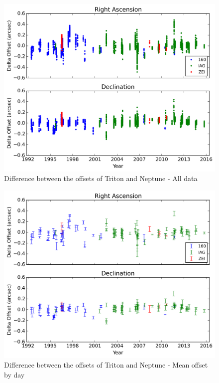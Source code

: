 \documentclass[12pt,a4paper]{report}
\begin{document}
\begin{figure}
\includegraphics[width=16.0cm]{Triton-Netuno_all.png} 
\caption{Difference between the offsets of Triton and Neptune - All data}
\label{Fig:triton-netuno-all}
\end{figure}
\begin{figure}
\includegraphics[width=16.0cm]{Triton-Netuno_media.png} 
\caption{Difference between the offsets of Triton and Neptune - Mean offset by day}
\label{Fig:triton-netuno-mean}
\end{figure}

\end{document}

